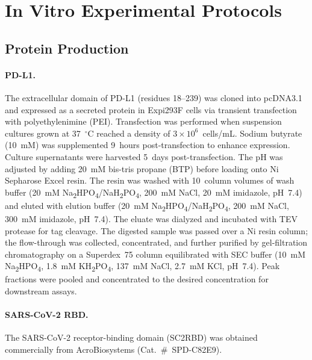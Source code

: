 \section{In Vitro Experimental Protocols}
\label{app:invitro_protocols}

\subsection{Protein Production}
\label{app:protein_production}

\paragraph{PD-L1.}
The extracellular domain of PD-L1 (residues 18--239) was cloned into pcDNA3.1 and expressed as a secreted protein in Expi293F cells via transient transfection with polyethylenimine (PEI). Transfection was performed when suspension cultures grown at 37~$^\circ$C reached a density of $3 \times 10^6$~cells/mL. Sodium butyrate (10~mM) was supplemented 9~hours post-transfection to enhance expression. Culture supernatants were harvested 5~days post-transfection. The pH was adjusted by adding 20~mM bis-tris propane (BTP) before loading onto Ni Sepharose Excel resin. The resin was washed with 10~column volumes of wash buffer (20~mM Na\textsubscript{2}HPO\textsubscript{4}/NaH\textsubscript{2}PO\textsubscript{4}, 200~mM NaCl, 20~mM imidazole, pH~7.4) and eluted with elution buffer (20~mM Na\textsubscript{2}HPO\textsubscript{4}/NaH\textsubscript{2}PO\textsubscript{4}, 200~mM NaCl, 300~mM imidazole, pH~7.4). The eluate was dialyzed and incubated with TEV protease for tag cleavage. The digested sample was passed over a Ni resin column; the flow-through was collected, concentrated, and further purified by gel-filtration chromatography on a Superdex~75 column equilibrated with SEC buffer (10~mM Na\textsubscript{2}HPO\textsubscript{4}, 1.8~mM KH\textsubscript{2}PO\textsubscript{4}, 137~mM NaCl, 2.7~mM KCl, pH~7.4). Peak fractions were pooled and concentrated to the desired concentration for downstream assays.

\paragraph{SARS-CoV-2 RBD.}
The SARS-CoV-2 receptor-binding domain (SC2RBD) was obtained commercially from AcroBiosystems (Cat.~\#~SPD-C82E9).


